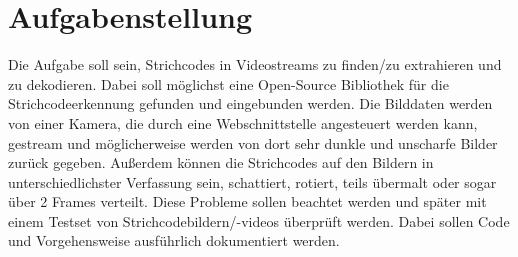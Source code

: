 \section{Aufgabenstellung}
\writtenby{\dcauthornameriren}%
Die Aufgabe soll sein, Strichcodes in Videostreams zu finden/zu extrahieren und zu dekodieren. Dabei soll möglichst eine Open-Source Bibliothek für die Strichcodeerkennung gefunden und eingebunden werden.
Die Bilddaten werden von einer Kamera, die durch eine Webschnittstelle angesteuert werden kann, gestream und möglicherweise werden von dort sehr dunkle und unscharfe Bilder zurück gegeben. Außerdem können die Strichcodes auf den Bildern in unterschiedlichster Verfassung sein, schattiert, rotiert, teils übermalt oder sogar über 2 Frames verteilt.
Diese Probleme sollen beachtet werden und später mit einem Testset von Strichcodebildern/-videos überprüft werden.
Dabei sollen Code und Vorgehensweise ausführlich dokumentiert werden.